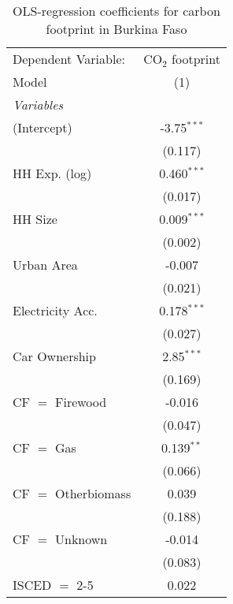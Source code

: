 
\begin{table}[htbp!]
   \centering
   \small
   \begin{adjustbox}{width = 1\textwidth, max height = 0.95\textheight, center}
      \begin{threeparttable}[b]
         \caption{\label{tab:OLS_2_BFA} OLS-regression coefficients for carbon footprint in Burkina Faso}
         \begin{tabular}{lc}
            \tabularnewline \midrule \midrule
            Dependent Variable: & CO$_{2}$ footprint\\  
            Model               & (1)\\  
            \midrule
            \emph{Variables}\\
            (Intercept)         & -3.75$^{***}$\\   
                                & (0.117)\\   
            HH Exp. (log)       & 0.460$^{***}$\\   
                                & (0.017)\\   
            HH Size             & 0.009$^{***}$\\   
                                & (0.002)\\   
            Urban Area          & -0.007\\   
                                & (0.021)\\   
            Electricity Acc.    & 0.178$^{***}$\\   
                                & (0.027)\\   
            Car Ownership       & 2.85$^{***}$\\   
                                & (0.169)\\   
            CF $=$ Firewood     & -0.016\\   
                                & (0.047)\\   
            CF $=$ Gas          & 0.139$^{**}$\\   
                                & (0.066)\\   
            CF $=$ Otherbiomass & 0.039\\   
                                & (0.188)\\   
            CF $=$ Unknown      & -0.014\\   
                                & (0.083)\\   
            ISCED $=$ 2-5       & 0.022\\   

\end{tabular}
\end{threeparttable}
\end{adjustbox}
\end{table}

